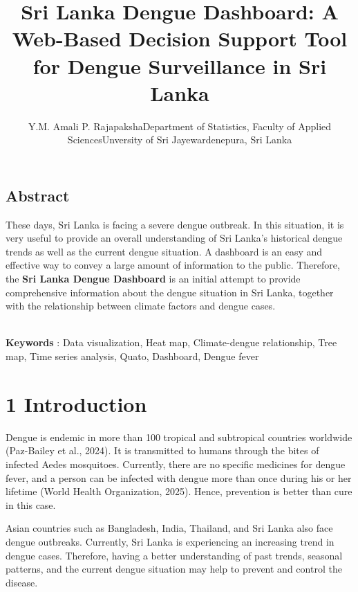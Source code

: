 \documentclass[
]{article}
\title{Sri Lanka Dengue Dashboard: A Web-Based Decision Support Tool for
Dengue Surveillance in Sri Lanka}
\author{Y.M. Amali P. RajapakshaDepartment of Statistics, Faculty of
Applied SciencesUnversity of Sri Jayewardenepura, Sri Lanka}
\date{}
\begin{document}
\maketitle


\subsection{\texorpdfstring{\textbf{Abstract}}{Abstract}}\label{abstract}

These days, Sri Lanka is facing a severe dengue outbreak. In this
situation, it is very useful to provide an overall understanding of Sri
Lanka's historical dengue trends as well as the current dengue
situation. A dashboard is an easy and effective way to convey a large
amount of information to the public. Therefore, the \textbf{Sri Lanka
Dengue Dashboard} is an initial attempt to provide comprehensive
information about the dengue situation in Sri Lanka, together with the
relationship between climate factors and dengue cases.\\
\strut \\
\textbf{Keywords} : Data visualization, Heat map, Climate-dengue
relationship, Tree map, Time series analysis, Quato, Dashboard, Dengue
fever

\section{1 Introduction}\label{introduction}

Dengue is endemic in more than 100 tropical and subtropical countries
worldwide (Paz-Bailey et al., 2024). It is transmitted to humans through
the bites of infected Aedes mosquitoes. Currently, there are no specific
medicines for dengue fever, and a person can be infected with dengue
more than once during his or her lifetime (World Health Organization,
2025). Hence, prevention is better than cure in this case.

Asian countries such as Bangladesh, India, Thailand, and Sri Lanka also
face dengue outbreaks. Currently, Sri Lanka is experiencing an
increasing trend in dengue cases. Therefore, having a better
understanding of past trends, seasonal patterns, and the current dengue
situation may help to prevent and control the disease.
\end{document}
